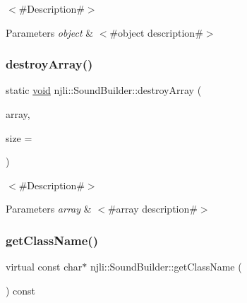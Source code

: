 $<$\#\+Description\#$>$


\begin{DoxyParams}{Parameters}
{\em object} & $<$\#object description\#$>$ \\
\hline
\end{DoxyParams}
\mbox{\label{classnjli_1_1_sound_builder_ab7d9d7b0f1239801eb2b4822326a5e0a}} 
\subsubsection{\texorpdfstring{destroy\+Array()}{destroyArray()}}
{\footnotesize\ttfamily static \mbox{\hyperlink{_thread_8h_af1e856da2e658414cb2456cb6f7ebc66}{void}} njli\+::\+Sound\+Builder\+::destroy\+Array (\begin{DoxyParamCaption}\item[{\mbox{\hyperlink{classnjli_1_1_sound_builder}{Sound\+Builder}} $\ast$$\ast$}]{array,  }\item[{const \mbox{\hyperlink{_util_8h_a10e94b422ef0c20dcdec20d31a1f5049}{u32}}}]{size = {} }\end{DoxyParamCaption})\hspace{0.3cm}{\ttfamily [static]}}

$<$\#\+Description\#$>$


\begin{DoxyParams}{Parameters}
{\em array} & $<$\#array description\#$>$ \\
\hline
\end{DoxyParams}
\mbox{\label{classnjli_1_1_sound_builder_afdebffb655601f61975dcd60f0aa1e50}} 
\subsubsection{\texorpdfstring{get\+Class\+Name()}{getClassName()}}
{\footnotesize\ttfamily virtual const char$\ast$ njli\+::\+Sound\+Builder\+::get\+Class\+Name (\begin{DoxyParamCaption}{ }\end{DoxyParamCaption}) const\hspace{0.3cm}{\ttfamily [virtual]}}

